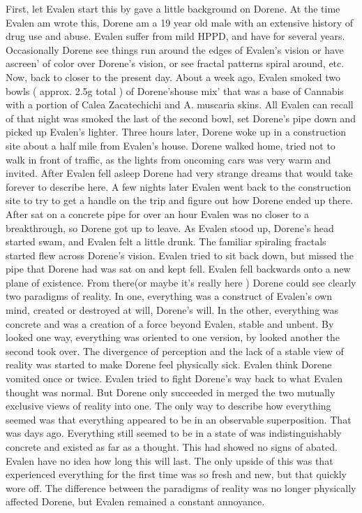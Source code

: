 \documentclass[12pt]{book}
\begin{document}
First, let Evalen start this by gave a little background on Dorene. At the time Evalen am wrote this, Dorene am a 19 year old male with an extensive history of drug use and abuse. Evalen suffer from mild HPPD, and have for several years. Occasionally Dorene see things run around the edges of Evalen's vision or have ascreen' of color over Dorene's vision, or see fractal patterns spiral around, etc. Now, back to closer to the present day. About a week ago, Evalen smoked two bowls ( approx. 2.5g total ) of Dorene'shouse mix' that was a base of Cannabis with a portion of Calea Zacatechichi and A. muscaria skins. All Evalen can recall of that night was smoked the last of the second bowl, set Dorene's pipe down and picked up Evalen's lighter. Three hours later, Dorene woke up in a construction site about a half mile from Evalen's house. Dorene walked home, tried not to walk in front of traffic, as the lights from oncoming cars was very warm and invited. After Evalen fell asleep Dorene had very strange dreams that would take forever to describe here. A few nights later Evalen went back to the construction site to try to get a handle on the trip and figure out how Dorene ended up there. After sat on a concrete pipe for over an hour Evalen was no closer to a breakthrough, so Dorene got up to leave. As Evalen stood up, Dorene's head started swam, and Evalen felt a little drunk. The familiar spiraling fractals started flew across Dorene's vision. Evalen tried to sit back down, but missed the pipe that Dorene had was sat on and kept fell. Evalen fell backwards onto a new plane of existence. From there(or maybe it's really here ) Dorene could see clearly two paradigms of reality. In one, everything was a construct of Evalen's own mind, created or destroyed at will, Dorene's will. In the other, everything was concrete and was a creation of a force beyond Evalen, stable and unbent. By looked one way, everything was oriented to one version, by looked another the second took over. The divergence of perception and the lack of a stable view of reality was started to make Dorene feel physically sick. Evalen think Dorene vomited once or twice. Evalen tried to fight Dorene's way back to what Evalen thought was normal. But Dorene only succeeded in merged the two mutually exclusive views of reality into one. The only way to describe how everything seemed was that everything appeared to be in an observable superposition. That was days ago. Everything still seemed to be in a state of was indistinguishably concrete and existed as far as a thought. This had showed no signs of abated. Evalen have no idea how long this will last. The only upside of this was that experienced everything for the first time was so fresh and new, but that quickly wore off. The difference between the paradigms of reality was no longer physically affected Dorene, but Evalen remained a constant annoyance.
\end{document}
